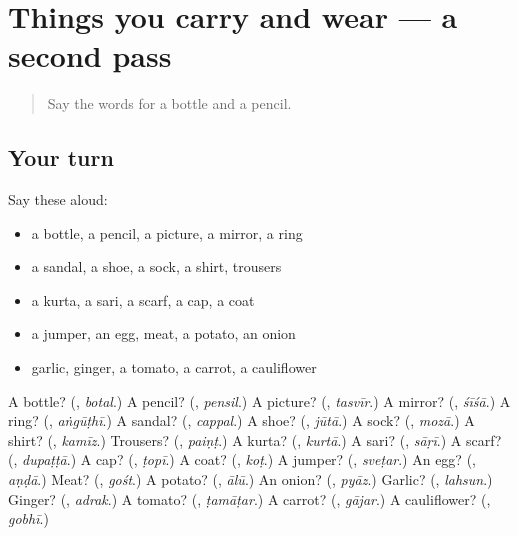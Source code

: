 \section[(dialogue)]{Things you carry and wear — a second pass}

\label{lesson:HI-R138-second-pass-things-you-carry-and-wear}



\begin{quote}
Say the words for a bottle and a pencil.
\end{quote}

\subsection*{Your turn}
Say these aloud:

\begin{itemize}
\raggedright
  \item a bottle, a pencil, a picture, a mirror, a ring
  \item a sandal, a shoe, a sock, a shirt, trousers
  \item a kurta, a sari, a scarf, a cap, a coat
  \item a jumper, an egg, meat, a potato, an onion
  \item garlic, ginger, a tomato, a carrot, a cauliflower
\end{itemize}

\begin{tcolorbox}[breakable,colback=teal!4,colframe=teal!35!black,title={Before you move on}]
A bottle? (\textbf{}, \emph{botal}.) A pencil? (\textbf{}, \emph{pensil}.) A picture? (\textbf{}, \emph{tasvīr}.) A mirror? (\textbf{}, \emph{śīśā}.) A ring? (\textbf{}, \emph{aṅgūṭhī}.) A sandal? (\textbf{}, \emph{cappal}.) A shoe? (\textbf{}, \emph{jūtā}.) A sock? (\textbf{}, \emph{mozā}.) A shirt? (\textbf{}, \emph{kamīz}.) Trousers? (\textbf{}, \emph{paiṇṭ}.) A kurta? (\textbf{}, \emph{kurtā}.) A sari? (\textbf{}, \emph{sāṛī}.) A scarf? (\textbf{}, \emph{dupaṭṭā}.) A cap? (\textbf{}, \emph{ṭopī}.) A coat? (\textbf{}, \emph{koṭ}.) A jumper? (\textbf{}, \emph{sveṭar}.) An egg? (\textbf{}, \emph{aṇḍā}.) Meat? (\textbf{}, \emph{gośt}.) A potato? (\textbf{}, \emph{ālū}.) An onion? (\textbf{}, \emph{pyāz}.) Garlic? (\textbf{}, \emph{lahsun}.) Ginger? (\textbf{}, \emph{adrak}.) A tomato? (\textbf{}, \emph{ṭamāṭar}.) A carrot? (\textbf{}, \emph{gājar}.) A cauliflower? (\textbf{}, \emph{gobhī}.)
\end{tcolorbox}
